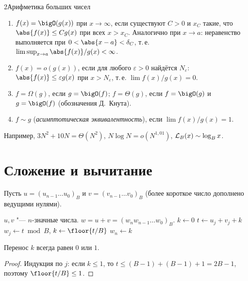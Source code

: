 \begin{lecture}{2}{Арифметика больших чисел}
\begin{definition}
\begin{enumerate}
  \item $f(x) = \bigO(g(x))$ при $x \to \infty$, если существуют $C > 0$ и $x_C$ такие, что
    $\abs{f(x)} \le C g(x)$ при всех $x > x_C$. Аналогично при $x \to a$: неравенство
    выполняется при $0 < \abs{x - a} < \delta_C$, т.\,е. $\limsup_{x \to a} \abs{f(x)}/g(x) < \infty$.
  \item $f(x) = o(g(x))$, если для любого $\varepsilon > 0$ найдётся $N_\varepsilon$:
    $\abs{f(x)} \le \varepsilon g(x)$ при $x > N_\varepsilon$, т.\,е. $\lim f(x)/g(x) = 0$.
  \item $f = \Omega(g)$, если $g = \bigO(f)$; $f = \Theta(g)$, если $f = \bigO(g)$ и $g = \bigO(f)$
    (обозначения Д.~Кнута).
  \item $f \sim g$ (\emph{асимптотическая эквивалентность}), если $\lim f(x)/g(x) = 1$.
\end{enumerate}
\end{definition}

Например, $3N^2 + 10N = \Theta(N^2)$, $N \log N = o(N^{1{,}01})$, $\mathcal{L}_B(x) \sim \log_B x$.

\section{Сложение и вычитание}

Пусть $u = (u_{n-1} \dots u_0)_B$ и $v = (v_{n-1} \dots v_0)_B$ (более короткое число дополнено
ведущими нулями).

\begin{algorithm}
\begin{algorithmic}[1]
\Require $u, v$ "--- $n$-значные числа.
\Ensure $w = u + v = (w_n w_{n-1} \dots w_0)_B$.
\State $k \gets 0$ 
  \State $t \gets u_j + v_j + k$
  \State $w_j \gets t \bmod B$, \quad $k \gets \floor{t / B}$
\EndFor
\State $w_n \gets k$
\end{algorithmic}
\end{algorithm}

\begin{lemma}
Перенос $k$ всегда равен $0$ или $1$.
\end{lemma}

\begin{proof}
Индукция по $j$: если $k \le 1$, то $t \le (B - 1) + (B - 1) + 1 = 2B - 1$, поэтому
$\floor{t/B} \le 1$.
\end{proof}


\end{lecture}
